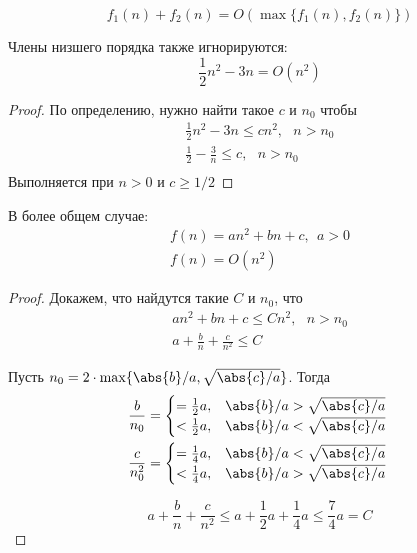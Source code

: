 
\begin{example}
$$
f_1(n) + f_2(n) = O(\max\{f_1(n), f_2(n)\})
$$
\end{example}


\begin{example}
Члены низшего порядка также игнорируются:
$$
\frac{1}{2}n^2 - 3n = O(n^2)
$$
\begin{proof}По определению, нужно найти такое $c$ и $n_0$ чтобы
$$
\begin{gathered}
\frac{1}{2}n^2 - 3n \leqslant c n^2,~~~ n>n_0\\
\frac{1}{2} - \frac{3}{n} \leqslant c,~~~ n>n_0\\
\end{gathered}
$$
Выполняется при $n>0$ и $c \geqslant 1/2$
\end{proof}
\end{example}


\begin{example}
В более общем случае:
$$
  \begin{gathered}
  f(n) = an^2 + bn + c,~~ a > 0\\
  f(n)=O(n^2)
  \end{gathered}
$$

\begin{proof}
Докажем, что найдутся такие $C$ и $n_0$, что
$$
  \begin{gathered}
  an^2 + bn + c \leqslant C n^2,~~~n>n_0\\
  a + \frac{b}{n}  + \frac{c}{n^2} \leqslant C
  \end{gathered}
$$

Пусть $n_0 = 2 \cdot \max\{\abs{b}/a, \sqrt{\abs{c}/a}\}$. Тогда
$$
  \begin{gathered}
    \frac{b}{n_0} = \begin{cases}
    = \frac{1}{2} a, & \abs{b}/a > \sqrt{\abs{c}/a}\ \\
    < \frac{1}{2} a, & \abs{b}/a < \sqrt{\abs{c}/a}\ \\
    \end{cases} \\
    \frac{c}{n^2_0} = \begin{cases}
    = \frac{1}{4} a, & \abs{b}/a < \sqrt{\abs{c}/a}\ \\
    < \frac{1}{4} a, & \abs{b}/a > \sqrt{\abs{c}/a}\ \\
    \end{cases}
  \end{gathered}
$$

$$
a + \frac{b}{n}  + \frac{c}{n^2}  \leqslant a + \frac{1}{2} a + \frac{1}{4} a \leqslant \boxed{\frac{7}{4} a = C}
$$
\end{proof}
\end{example}

